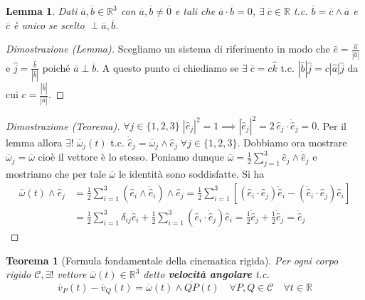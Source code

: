 \documentclass{book}
\theoremstyle{plain}
\newtheorem{teo}{Teorema}[chapter]
\theoremstyle{plain}
\newtheorem*{lemma}{Lemma}
\theoremstyle{plain}
\theoremstyle{plain}
\theoremstyle{plain}
\theoremstyle{definition}
\theoremstyle{remark}
\theoremstyle{definition}
\begin{document}
\begin{lemma}
    Dati $\overline{a}, \overline{b} \in \mathbb{R}^3$ con $\overline{a}, \overline{b} \neq \overline{0}$ e tali che $\overline{a}\cdot\overline{b}=0$, $\exists \; \overline{c} \in \mathbb{R}$ t.c. $\overline{b}=\overline{c}\wedge \overline{a}$ e $\overline{c}$ è unico se scelto $\perp \overline{a}, \overline{b}$.
\end{lemma}

\begin{proof} [Dimostrazione (Lemma)]
    Scegliamo un sistema di riferimento in modo che $\hat{e}=\frac{\hat{a}}{|\hat{a}|}$ e $\hat{j}=\frac{\hat{b}}{|\hat{b}|}$ poiché $\overline{a} \perp \overline{b}$. A questo punto ci chiediamo se $\exists \; \overline{c}=c\hat{k}$ t.c. $|\hat{b}|\hat{j}=c|\hat{a}|\hat{j}$ da cui $c=\frac{|\hat{b}|}{|\hat{a}|}$.
\end{proof}

\begin{proof}[Dimostrazione (Teorema)]
    $\forall j \in \{1, 2, 3\} \;|\hat{e}_j|^2=1\implies|\Dot{\hat{e}}_j|^2=2\,\hat{e}_j\cdot\Dot{\hat{e}}_j=0$. Per il lemma allora $\exists! \;\overline{\omega}_j(t)$ t.c. $\Dot{\hat{e}}_j=\overline{\omega}_j\wedge\hat{e}_j \; \forall j \in \{1, 2, 3\}$. Dobbiamo ora mostrare $\overline{\omega}_j=\overline{\omega}$ cioè il vettore è lo stesso. Poniamo dunque $\overline{\omega}=\frac{1}{2}\sum_{j=1}^3\hat{e}_j\wedge\Dot{\hat{e}}_j$ e mostriamo che per tale $\overline{\omega}$ le identità sono soddisfatte. Si ha
    \[
    \begin{split}
        \overline{\omega}(t)\wedge\hat{e}_j &=\frac{1}{2}\sum_{i=1}^3\left(\hat{e}_i\wedge\Dot{\hat{e}}_i\right)\wedge\hat{e}_j= \frac{1}{2}\sum_{i=1}^3\left[\left(\hat{e}_i\cdot\hat{e}_j\right)\Dot{\hat{e}}_i-\left(\Dot{\hat{e}}_i\cdot\hat{e}_j\right)\hat{e}_i\right] \\
        &=\frac{1}{2}\sum_{i=1}^3\delta_{ij}\Dot{\hat{e}}_i+\frac{1}{2}\sum_{i=1}^3\left(\hat{e}_i\cdot\Dot{\hat{e}}_j\right)\hat{e}_i=\frac{1}{2}\Dot{\hat{e}}_j+\frac{1}{2}\Dot{\hat{e}}_j=\Dot{\hat{e}}_j
    \end{split}
    \]
\end{proof}

\begin{teo}[Formula fondamentale della cinematica rigida]
    Per ogni corpo rigido $\mathcal{C}, \exists!$ vettore $\overline{\omega}(t) \in \mathbb{R}^{3}$ detto \textbf{velocità angolare} t.c.
    \begin{displaymath}
    \boxed{
        \overline{v}_{P}(t)-\overline{v}_{Q}(t)=\overline{\omega}(t) \wedge \overline{Q P}(t) \quad \forall P, Q \in \mathcal{C} \quad \forall t \in \mathbb{R}
        }
    \end{displaymath}
\end{teo}
\end{document}
